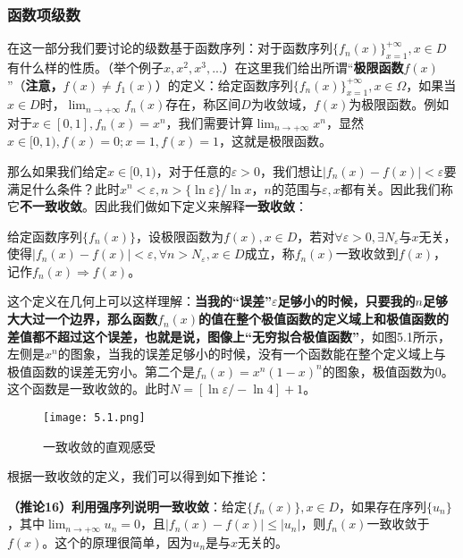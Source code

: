 \documentclass{ctexart}
\let\oldtextbf\textbf
\renewcommand{\textbf}[1]{\textcolor{brown!50!red}{\oldtextbf{#1}}}
\begin{document}
\subsubsection{函数项级数}
在这一部分我们要讨论的级数基于函数序列：对于函数序列$\{ f_n(x)\}_{x=1}^{+\infty},x\in D$有什么样的性质。（举个例子$x,x^2,x^3,...$）在这里我们给出所谓“\textbf{\color{brown!50!red}极限函数}$f(x)$”（\textbf{\color{brown!50!red}注意，$f(x)\neq f_1(x)$}）的定义：给定函数序列$\{ f_n(x)\}_{x=1}^{+\infty},x\in \Omega$，如果当$x\in D$时，$\lim_{n\to+\infty} f_n(x)$存在，称区间$D$为收敛域，$f(x)$为极限函数。例如对于$x\in[0,1],f_n(x)=x^n$，我们需要计算$\lim_{n\to+\infty}x^n$，显然$x\in[0,1),f(x)=0;x=1,f(x)=1$，这就是极限函数。

那么如果我们给定$x\in[0,1)$，对于任意的$\varepsilon>0$，我们想让$|f_n(x)-f(x)|<\varepsilon$要满足什么条件？此时$x^n<\varepsilon,n>\{\ln \varepsilon\}/{\ln x}$，$n$的范围与$\varepsilon,x$都有关。因此我们称它\textbf{\color{brown!50!red}不一致收敛}。因此我们做如下定义来解释\textbf{\color{brown!50!red}一致收敛}：

给定函数序列$\{f_n(x)\}$，设极限函数为$f(x),x\in D$，若对$\forall \varepsilon>0,\exists N_\varepsilon$与$x$无关，使得$|f_n(x)-f(x)|<\varepsilon,\forall n>N_\varepsilon,x\in D$成立，称$f_n(x)$一致收敛到$f(x)$，记作$f_n(x)\Longrightarrow f(x)$。

这个定义在几何上可以这样理解：\textbf{\color{brown!50!red}当我的“误差”$\varepsilon$足够小的时候，只要我的$n$足够大大过一个边界，那么函数$f_n(x)$的值在整个极值函数的定义域上和极值函数的差值都不超过这个误差，也就是说，图像上“无穷拟合极值函数”}，如图5.1所示，左侧是$x^n$的图象，当我的误差足够小的时候，没有一个函数能在整个定义域上与极值函数的误差无穷小。第二个是$f_n(x)=x^n(1-x)^n$的图象，极值函数为$0$。这个函数是一致收敛的。此时$N=[\ln \varepsilon/-\ln4]+1$。
\begin{figure}[H]    
\centering     
\renewcommand{\figurename}{图}     
\renewcommand{\thefigure}{5.1}    
\begin{myimagebox}[width=0.69\textwidth] %
\texttt{[image: 5.1.png]} %
\end{myimagebox}     
\caption{\label{fig:1.1}一致收敛的直观感受}   
\end{figure}

根据一致收敛的定义，我们可以得到如下推论：
\begin{tcolorbox}[
    colback=bac2,     %
    colframe=fra2,   %
    coltitle=white,             %
    coltext=tex2,
    title=利用强级数说明一致收敛,
    fonttitle=\bfseries,        %
arc=3mm,                     %
breakable
]
\textbf{\color{brown!50!red}（推论16）利用强序列说明一致收敛}：给定$\{f_n(x)\},x\in D$，如果存在序列$\{u_n\}$，其中$\lim_{n\to+\infty}u_n=0$，且$|f_n(x)-f(x)|\leq |u_n|$，则$f_n(x)$一致收敛于$f(x)$。这个的原理很简单，因为$u_n$是与$x$无关的。
\end{tcolorbox}
\end{document}
